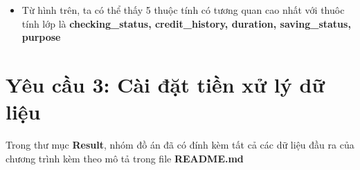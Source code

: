\documentclass[a4paper, 12pt]{article}
\begin{document}
\begin{itemize}
    \item Từ hình trên, ta có thể thấy 5 thuộc tính có tương quan cao nhất với thuôc tính lớp là \textbf{checking\_status, credit\_history, duration, saving\_status, purpose}
\end{itemize}

\section{Yêu cầu 3: Cài đặt tiền xử lý dữ liệu}
Trong thư mục \textbf{Result}, nhóm đồ án đã có đính kèm tất cả các dữ liệu đầu ra của chương trình kèm theo mô tả trong file \textbf{README.md}
\end{document}
